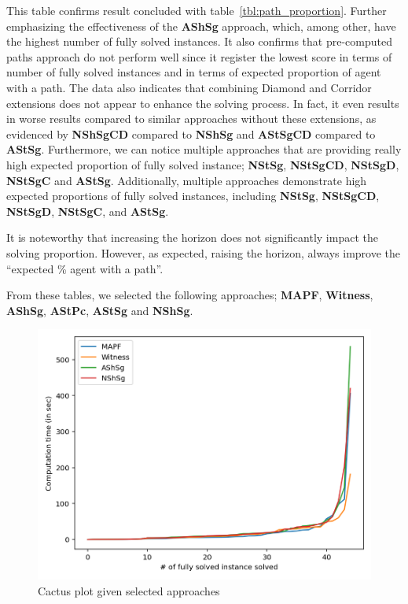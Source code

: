 

This table confirms result concluded with table~\ref{tbl:path_proportion}. Further emphasizing the effectiveness of the \textbf{AShSg} approach, which, among other, have the highest number of fully solved instances.  It also confirms that pre-computed paths approach do not perform well since it register the lowest score in terms of number of fully solved instances and in terms of expected proportion of agent with a path.
The data also indicates that combining Diamond and Corridor extensions does not appear to enhance the solving process. In fact, it even results in worse results compared to similar approaches without these extensions, as evidenced by \textbf{NShSgCD} compared to \textbf{NShSg} and \textbf{AStSgCD} compared to \textbf{AStSg}.
Furthermore, we can notice multiple approaches that are providing really high expected proportion of fully solved instance; \textbf{NStSg}, \textbf{NStSgCD}, \textbf{NStSgD}, \textbf{NStSgC} and \textbf{AStSg}.
Additionally, multiple approaches demonstrate high expected proportions of fully solved instances, including \textbf{NStSg}, \textbf{NStSgCD}, \textbf{NStSgD}, \textbf{NStSgC}, and \textbf{AStSg}.

It is noteworthy that increasing the horizon does not significantly impact the solving proportion. However, as expected, raising the horizon, always improve the ``expected \% agent with a path''.

From these tables, we selected the following approaches; \textbf{MAPF}, \textbf{Witness}, \textbf{AShSg}, \textbf{AStPc}, \textbf{AStSg} and \textbf{NShSg}.

\begin{figure}[H]
    \centering
    \caption{Cactus plot given selected approaches}\label{fig:cactus}
    \includegraphics[width=\widthimg]{img/plt_cactus.png}
\end{figure}


